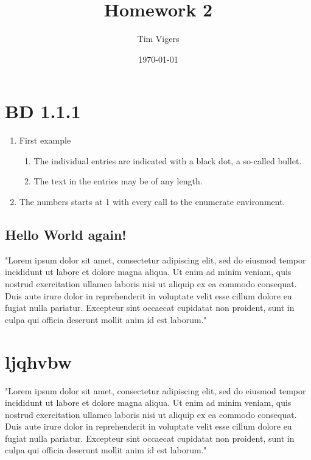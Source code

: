 \documentclass[a4paper,12pt]{article}
\begin{document}
\title{Homework 2}
\author{Tim Vigers}
\date{\today}
\maketitle

\section{BD 1.1.1}
\begin{enumerate}
  \item First example
  \begin{enumerate}
     \item The individual entries are indicated with a black dot, a so-called bullet.
     \item The text in the entries may be of any length.
   \end{enumerate}
  \item The numbers starts at 1 with every call to the enumerate environment.
\end{enumerate}



\subsection{Hello World again!}
"Lorem ipsum dolor sit amet, consectetur adipiscing elit, sed do eiusmod tempor incididunt ut labore et dolore magna aliqua. Ut enim ad minim veniam, quis nostrud exercitation ullamco laboris nisi ut aliquip ex ea commodo consequat. Duis aute irure dolor in reprehenderit in voluptate velit esse cillum dolore eu fugiat nulla pariatur. Excepteur sint occaecat cupidatat non proident, sunt in culpa qui officia deserunt mollit anim id est laborum."

\newpage

\section{ljqhvbw}
"Lorem ipsum dolor sit amet, consectetur adipiscing elit, sed do eiusmod tempor incididunt ut labore et dolore magna aliqua. Ut enim ad minim veniam, quis nostrud exercitation ullamco laboris nisi ut aliquip ex ea commodo consequat. Duis aute irure dolor in reprehenderit in voluptate velit esse cillum dolore eu fugiat nulla pariatur. Excepteur sint occaecat cupidatat non proident, sunt in culpa qui officia deserunt mollit anim id est laborum."
\end{document}
